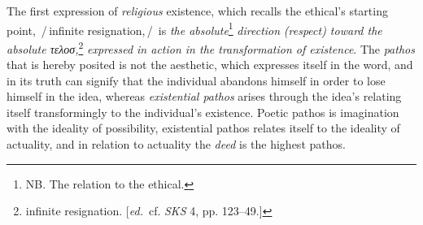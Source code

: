 \documentclass[12pt,a4paper,openany]{book}
\newcommand{\ed}[1]{{\small[\textit{ed.}\ #1]}}
\newcommand{\ins}[1]{\,/\,#1\,/\,}
\begin{document}
The first expression of \emph{religious} existence, which recalls the ethical's
starting point, \ins{infinite resignation,} is \emph{the absolute}\footnote[67]{
NB. The relation to the ethical.}
\emph{direction}
\emph{(respect) toward the absolute τελοσ,}\footnote[68]{
infinite resignation. \ed{cf. \emph{SKS} 4, pp. 123--49.}}
\emph{expressed in action in the transformation of existence}.
The \emph{pathos} that is hereby posited is not the aesthetic, which
expresses itself in the word, and in its truth can signify that the individual
abandons himself in order to lose himself in the idea, whereas \emph{existential pathos}
arises through the idea's relating itself transformingly to the individual's
existence. Poetic pathos is imagination with the ideality of
possibility, existential pathos relates itself to the ideality of actuality,
and in relation to actuality the \emph{deed} is the highest pathos.
\end{document}
